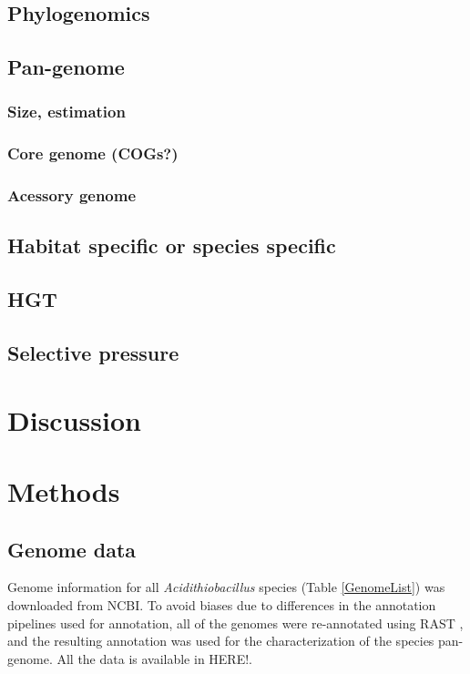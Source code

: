 \documentclass[11pt]{article}
\begin{document}
\subsection*{Phylogenomics}

\subsection*{Pan-genome}

\subsubsection*{Size, estimation}
\subsubsection*{Core genome (COGs?)}
\subsubsection*{Acessory genome}


\subsection*{Habitat specific or species specific}

\subsection*{HGT}

\subsection*{Selective pressure}

\section*{Discussion}

\section*{Methods}

\subsection*{Genome data}

Genome information for all \textit{Acidithiobacillus} species (Table \ref{GenomeList}) was downloaded from NCBI. To avoid biases due to differences in the annotation pipelines used for annotation, all of the genomes were re-annotated using RAST \cite{Aziz:2008kua,Overbeek:2014gg}, and the resulting annotation was used for the characterization of the species pan-genome. All the data is available in HERE!.
\end{document}
